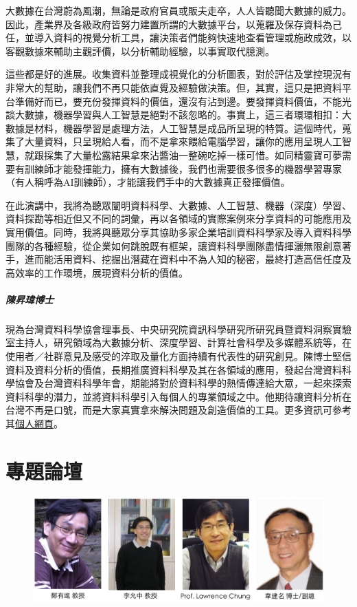 \documentclass[12pt,oneside,a4paper]{book}
\newcommand{\mIndent}{\hspace{.5cm}}
\begin{document}
大數據在台灣蔚為風潮，無論是政府官員或販夫走卒，人人皆聽聞大數據的威力。因此，產業界及各級政府皆努力建置所謂的大數據平台，以蒐羅及保存資料為己任，並導入資料的視覺分析工具，讓決策者們能夠快速地查看管理或施政成效，以客觀數據來輔助主觀評價，以分析輔助經驗，以事實取代臆測。

\mIndent 這些都是好的進展。收集資料並整理成視覺化的分析圖表，對於評估及掌控現況有非常大的幫助，讓我們不再只能依直覺及經驗做決策。但，其實，這只是把資料平台準備好而已，要充份發揮資料的價值，還沒有沾到邊。要發揮資料價值，不能光談大數據，機器學習與人工智慧是絕對不該忽略的。事實上，這三者環環相扣：大數據是材料，機器學習是處理方法，人工智慧是成品所呈現的特質。這個時代，蒐集了大量資料，只呈現給人看，而不是拿來餵給電腦學習，讓你的應用呈現人工智慧，就跟採集了大量松露結果拿來沾醬油一整碗吃掉一樣可惜。如同精靈寶可夢需要有訓練師才能發揮能力，擁有大數據後，我們也需要很多很多的機器學習專家（有人稱呼為AI訓練師），才能讓我們手中的大數據真正發揮價值。

\mIndent 在此演講中，我將為聽眾闡明資料科學、大數據、人工智慧、機器（深度）學習、資料探勘等相近但又不同的詞彙，再以各領域的實際案例來分享資料的可能應用及實用價值。同時，我將與聽眾分享其協助多家企業培訓資料科學家及導入資料科學團隊的各種經驗，從企業如何跳脫既有框架，讓資料科學團隊盡情揮灑無限創意著手，進而能活用資料、挖掘出潛藏在資料中不為人知的秘密，最終打造高信任度及高效率的工作環境，展現資料分析的價值。

\paragraph{陳昇瑋博士} 現為台灣資料科學協會理事長、中央研究院資訊科學研究所研究員暨資料洞察實驗室主持人，研究領域為大數據分析、深度學習、計算社會科學及多媒體系統等，在使用者／社群意見及感受的淬取及量化方面持續有代表性的研究創見。陳博士堅信資料及資料分析的價值，長期推廣資料科學及其在各領域的應用，發起台灣資料科學協會及台灣資料科學年會，期能將對於資料科學的熱情傳達給大眾，一起來探索資料科學的潛力，並將資料科學引入每個人的專業領域之中。他期待讓資料分析在台灣不再是口號，而是大家真實拿來解決問題及創造價值的工具。更多資訊可參考其\href{http://www.iis.sinica.edu.tw/~swc/index_c.html}{個人網頁}。

\chapter*{專題論壇}
%

\begin{figure}[h!]
\begin{center}
\includegraphics[width=1\columnwidth]{images/panel.png}
\end{center}
\end{figure}
\end{document}
